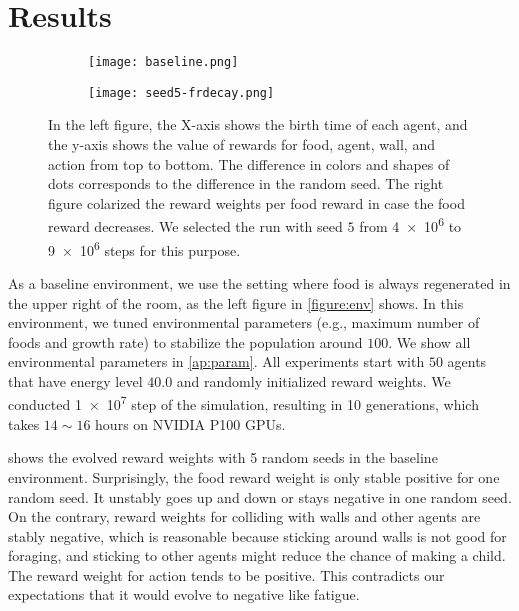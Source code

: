 \section{Results}

\begin{figure}[t]
  \begin{subfigure}[t]{7.5cm}
    \centering
    \texttt{[image: baseline.png]}
    \label{subfigure:bl}
  \end{subfigure}
  \begin{subfigure}[t]{7.5cm}
    \centering
    \texttt{[image: seed5-frdecay.png]}
    \label{subfigure:s5cs}
  \end{subfigure}
  \caption{
    In the left figure, the X-axis shows the birth time of each agent, and the y-axis shows the value of rewards for food, agent, wall, and action from top to bottom. The difference in colors and shapes of dots corresponds to the difference in the random seed. The right figure colarized the reward weights per food reward in case the food reward decreases. We selected the run with seed $5$ from \num{4e6} to \num{9e6} steps for this purpose.
  }\label{figure:baseline-result}
\end{figure}

As a baseline environment, we use the setting where food is always regenerated in the upper right of the room, as the left figure in \cref{figure:env} shows. In this environment, we tuned environmental parameters (e.g., maximum number of foods and growth rate) to stabilize the population around $100$. We show all environmental parameters in \cref{ap:param}. All experiments start with $50$ agents that have energy level $40.0$ and randomly initialized reward weights. We conducted \num{1e7} step of the simulation, resulting in 10  generations, which takes $14\sim16$ hours on NVIDIA P100 GPUs.

 shows the evolved reward weights with 5 random seeds in the baseline environment. Surprisingly, the food reward weight is only stable positive for one random seed. It unstably goes up and down or stays negative in one random seed. On the contrary, reward weights for colliding with walls and other agents are stably negative, which is reasonable because sticking around walls is not good for foraging, and sticking to other agents might reduce the chance of making a child. The reward weight for action tends to be positive. This contradicts our expectations that it would evolve to negative like fatigue.

